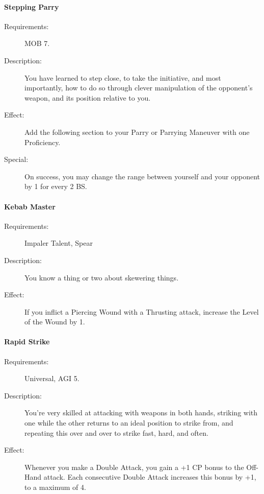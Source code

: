 \documentclass[oneside,11pt,english]{book}
\begin{document}
\paragraph{\label{talent:Stepping Parry}Stepping Parry}
\begin{description}
	\item [Requirements:] MOB 7. 
	\item [Description:] You have learned to step close, to take the initiative, and most importantly, how to do so 
	through clever manipulation of the opponent’s weapon, and its position relative to you. 
	\item [Effect:] Add the following section to your Parry or Parrying Maneuver with one Proficiency. 
	\item [Special:] On success, you may change the range between yourself and your opponent by 1 for every 2 BS.
	
\end{description}
\paragraph{\label{talent:Kebab Master}Kebab Master}
\begin{description}
	\item [Requirements:] Impaler Talent, Spear 
	\item [Description:] You know a thing or two about skewering things. 
	\item [Effect:] If you inflict a Piercing Wound with a Thrusting attack, increase the Level of the Wound by 1. 
	
\end{description}
\paragraph{\label{talent:Rapid Strike}Rapid Strike}
\begin{description}
	\item [Requirements:] Universal, AGI 5. 
	\item [Description:] You're very skilled at attacking with weapons in both hands, striking with one while the other returns to an ideal position to strike from, and repeating this over and over to strike fast, hard, and often.
	\item [Effect:] Whenever you make a Double Attack, you gain a +1 CP bonus to the Off-Hand attack. Each consecutive Double Attack increases this bonus by +1, to a maximum of 4. 
	
\end{description}
\end{document}
